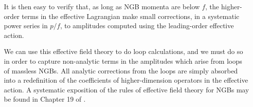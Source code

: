 It is then easy to verify that, as long as NGB momenta are below $f$, the
higher-order terms in the effective Lagrangian make small corrections, in a
systematic power series in $p/f$, to amplitudes computed using the leading-order
effective action.


We can use this effective field theory to do loop calculations, and we must do
so in order to capture non-analytic terms in the amplitudes which arise from
loops of massless NGBs. All analytic corrections from the loops are simply
absorbed into a redefinition of the coefficients of higher-dimension operators
in the effective action. A systematic exposition of the rules of effective
field theory for NGBs may be found in Chapter 19 of \cite{banks-ref-131}.
